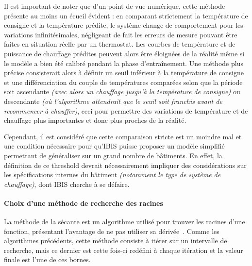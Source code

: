         \begin{bluebox}
            Il est important de noter que d'un point de vue numérique, cette méthode présente au moins un écueil évident : en comparant strictement la température de consigne et la température prédite, 
            le système change de comportement pour les variations infinitésimales, négligeant de fait les erreurs de mesure pouvant être faites en situation réelle par un thermostat.
            Les courbes de température et de puissance de chauffage prédites peuvent alors être éloignées de la réalité même si le modèle a bien été calibré pendant la phase d'entraînement.
            Une méthode plus précise consisterait alors à définir un seuil inférieur à la température de consigne et une différenciation du couple de températures comparées selon que la période soit ascendante \textit{(avec alors un chauffage jusqu'à la température de consigne)} ou descendante \textit{(où l'algorithme attendrait que le seuil soit franchis avant de recommencer à chauffer)},
            ceci pour permettre des variations de température et de chauffage plus importantes et donc plus proches de la réalité.

            Cependant, il est considéré que cette comparaison stricte est un moindre mal et une condition nécessaire pour qu'IBIS puisse proposer un modèle simplifié permettant de généraliser sur un grand nombre de bâtiments.
            En effet, la définition de ce threshold devrait nécessairement impliquer des considérations sur les spécifications internes du bâtiment \textit{(notamment le type de système de chauffage)}, dont IBIS cherche à se défaire.
        \end{bluebox}

        \paragraph{Choix d'une méthode de recherche des racines}\label{par:racines}

        La méthode de la sécante est un \gls{algorithme} utilisé pour trouver les racines d'une fonction, présentant l'avantage de ne pas utiliser sa dérivée~\cite{numerical_analysis}.
        Comme les \gls{algorithme}s précédents, cette méthode consiste à itérer sur un intervalle de recherche, mais ce dernier est cette fois-ci redéfini à chaque itération et la valeur finale est l'une de ces bornes.

